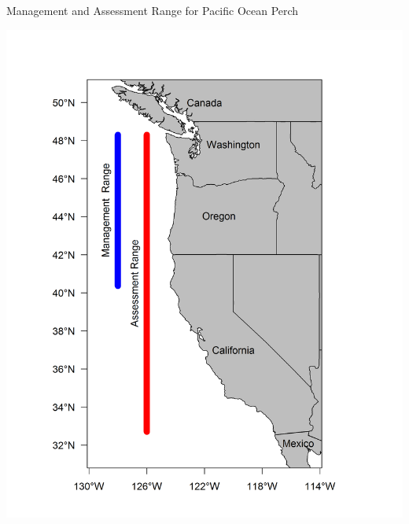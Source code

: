 \documentclass[pdf]{beamer}\usepackage[]{graphicx}\usepackage[]{color}
\begin{document}
\begin{frame}{Management and Assessment Range for Pacific Ocean Perch}
  \begin{center}
    \includegraphics[scale = 0.40]{figures/assess_region_map.png}
  \end{center}
\end{frame}
\end{document}
